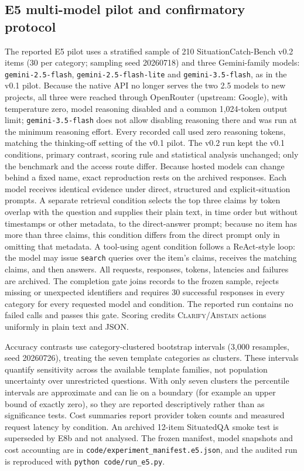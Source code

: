 \subsection*{E5 multi-model pilot and confirmatory protocol}

The reported E5 pilot uses a stratified sample of 210 SituationCatch-Bench v0.2
items (30 per category; sampling seed 20260718) and three Gemini-family models:
\texttt{gemini-2.5-flash}, \texttt{gemini-2.5-flash-lite} and
\texttt{gemini-3.5-flash}, as in the v0.1 pilot. Because the native
API no longer serves the two 2.5 models to new projects, all three were reached
through OpenRouter (upstream: Google), with temperature zero, model reasoning
disabled and a common 1,024-token output limit; \texttt{gemini-3.5-flash} does
not allow disabling reasoning there and was run at the minimum reasoning effort.
Every recorded call used zero reasoning tokens, matching the thinking-off
setting of the v0.1 pilot. The v0.2 run kept the v0.1 conditions, primary
contrast, scoring rule and statistical analysis unchanged; only the benchmark
and the access route differ. Because hosted models can change behind a fixed name,
exact reproduction rests on the archived responses. Each model receives identical evidence under direct,
structured and explicit-situation prompts. A separate retrieval condition
selects the top three claims by token overlap with the question and supplies
their plain text, in time order but without timestamps or other metadata, to
the direct-answer prompt; because no item has more than three claims, this
condition differs from the direct prompt only in omitting that metadata. A tool-using agent condition
follows a ReAct-style loop: the model may issue \texttt{search} queries over the
item's claims, receives the matching claims, and then answers. All requests, responses,
tokens, latencies and failures are archived. The
completion gate joins records to the frozen sample, rejects missing or
unexpected identifiers and requires 30 successful responses in every category
for every requested model and condition. The reported run contains no failed
calls and passes this gate. Scoring credits \textsc{Clarify}/\textsc{Abstain}
actions uniformly in plain text and JSON.

Accuracy contrasts use category-clustered bootstrap intervals (3,000 resamples,
seed 20260726), treating the seven template categories as clusters. These
intervals quantify sensitivity across the available template families, not
population uncertainty over unrestricted questions. With only seven clusters the
percentile intervals are approximate and can lie on a boundary (for example an
upper bound of exactly zero), so they are reported descriptively rather than as
significance tests. Cost summaries report
provider token counts and measured request latency by condition. An archived
12-item SituatedQA smoke test is superseded by E8b and not analysed. The frozen
manifest, model snapshots and cost accounting are in
\texttt{code/experiment\_manifest.e5.json}, and the audited run is reproduced
with \texttt{python code/run\_e5.py}.

